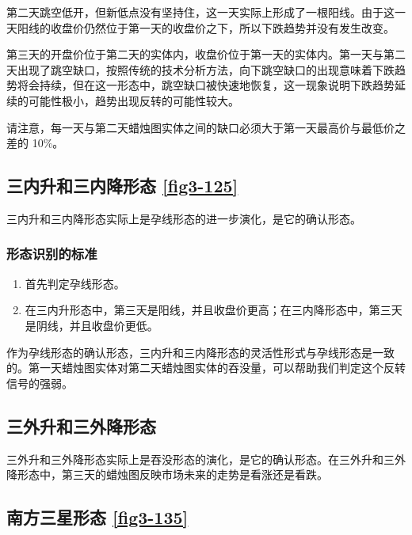 第二天跳空低开，但新低点没有坚持住，这一天实际上形成了一根阳线。由于这一天阳线的收盘价仍然位于第一天的收盘价之下，所以下跌趋势并没有发生改变。

第三天的开盘价位于第二天的实体内，收盘价位于第一天的实体内。第一天与第二天出现了跳空缺口，按照传统的技术分析方法，向下跳空缺口的出现意味着下跌趋势将会持续，但在这一形态中，跳空缺口被快速地恢复，这一现象说明下跌趋势延续的可能性极小，趋势出现反转的可能性较大。

请注意，每一天与第二天蜡烛图实体之间的缺口必须大于第一天最高价与最低价之差的 10\%。
\subsection{三内升和三内降形态 \autoref{fig3-125}}
三内升和三内降形态实际上是孕线形态的进一步演化，是它的确认形态。
\subsubsection*{形态识别的标准}
\begin{enumerate}
    \item 首先判定孕线形态。
    \item 在三内升形态中，第三天是阳线，并且收盘价更高；在三内降形态中，第三天是阴线，并且收盘价更低。
\end{enumerate}

作为孕线形态的确认形态，三内升和三内降形态的灵活性形式与孕线形态是一致的。第一天蜡烛图实体对第二天蜡烛图实体的吞没量，可以帮助我们判定这个反转信号的强弱。
\subsection{三外升和三外降形态}
三外升和三外降形态实际上是吞没形态的演化，是它的确认形态。在三外升和三外降形态中，第三天的蜡烛图反映市场未来的走势是看涨还是看跌。
\subsection{南方三星形态 \autoref{fig3-135}}
